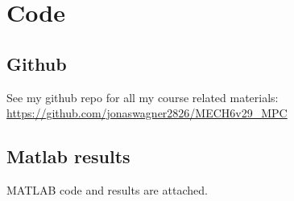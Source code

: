 \documentclass[]{article}
\begin{document}




\newpage
\appendix
\section{Code}
\subsection{Github}
See my github repo for all my course related materials: 
\url{https://github.com/jonaswagner2826/MECH6v29_MPC}

\subsection{Matlab results}
MATLAB code and results are attached.
% 
% 
% 
\end{document}

